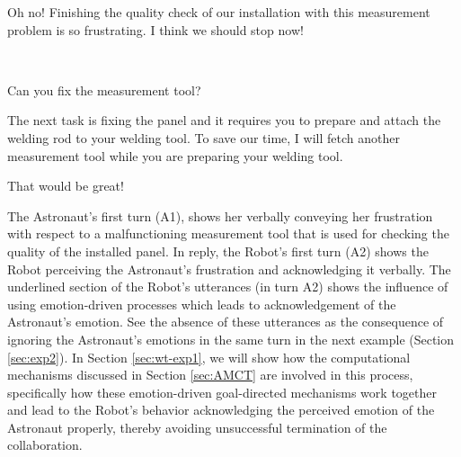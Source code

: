 \begin{description}
  \item \textit{\textbf{\fontsize{9pt}{12pt}\selectfont{A1. Astronaut:}}} Oh
  no! Finishing the quality check of our installation with this measurement
  problem is so frustrating. I think we should stop now!\\

  \item {}\\
  
  \item \textit{\textbf{\fontsize{9pt}{12pt}\selectfont{A3. Astronaut:}}} Can
  you fix the measurement tool?\\

  \item \textit{\textbf{\fontsize{9pt}{12pt}\selectfont{A4. Robot:}}} The next
  task is fixing the panel and it requires you to prepare and attach the welding
  rod to your welding tool. To save our time, I will fetch another measurement
  tool while you are preparing your welding tool.\\

  \item \textit{\textbf{\fontsize{9pt}{12pt}\selectfont{A5. Astronaut:}}} That
  would be great!
  
\end{description}

The Astronaut's first turn (A1), shows her verbally conveying her frustration
with respect to a malfunctioning measurement tool that is used for checking the
quality of the installed panel. In reply, the Robot's first turn (A2) shows the
Robot perceiving the Astronaut's frustration and acknowledging it verbally. The
underlined section of the Robot's utterances (in turn A2) shows the influence of
using emotion-driven processes which leads to acknowledgement of the Astronaut's
emotion. See the absence of these utterances as the consequence of ignoring the
Astronaut's emotions in the same turn in the next example (Section
\ref{sec:exp2}). In Section \ref{sec:wt-exp1}, we will show how the
computational mechanisms discussed in Section \ref{sec:AMCT} are involved in
this process, specifically how these emotion-driven goal-directed mechanisms
work together and lead to the Robot's behavior acknowledging the perceived
emotion of the Astronaut properly, thereby avoiding unsuccessful termination of
the collaboration.

